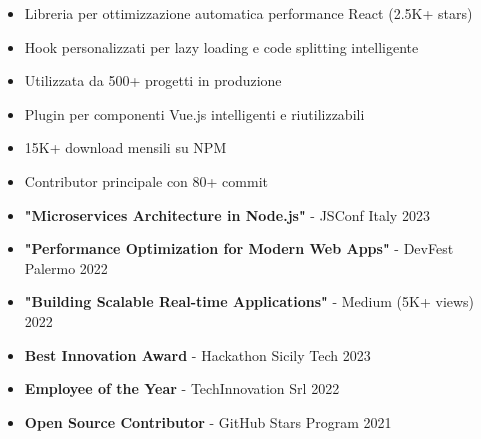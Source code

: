 \documentclass[10pt,a4paper,ragged2e,withhyper]{altacv}
\begin{document}
\clearpage
{}


\begin{itemize}
\item Libreria per ottimizzazione automatica performance React (2.5K+ stars)
\item Hook personalizzati per lazy loading e code splitting intelligente
\item Utilizzata da 500+ progetti in produzione
\end{itemize}

\divider

\begin{itemize}
\item Plugin per componenti Vue.js intelligenti e riutilizzabili
\item 15K+ download mensili su NPM
\item Contributor principale con 80+ commit
\end{itemize}


\begin{itemize}
\item \textbf{"Microservices Architecture in Node.js"} - JSConf Italy 2023
\item \textbf{"Performance Optimization for Modern Web Apps"} - DevFest Palermo 2022
\item \textbf{"Building Scalable Real-time Applications"} - Medium (5K+ views) 2022
\end{itemize}


\begin{itemize}
\item \textbf{Best Innovation Award} - Hackathon Sicily Tech 2023
\item \textbf{Employee of the Year} - TechInnovation Srl 2022
\item \textbf{Open Source Contributor} - GitHub Stars Program 2021
\end{itemize}
\end{document}

